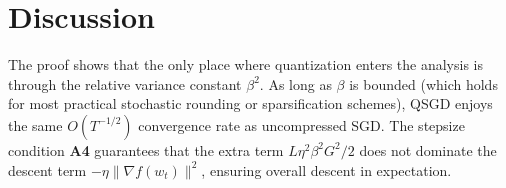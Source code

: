 \documentclass{article}
\begin{document}
\section*{Discussion}
The proof shows that the only place where quantization enters the analysis is through the relative variance constant $\beta^{2}$. As long as $\beta$ is bounded (which holds for most practical stochastic rounding or sparsification schemes), QSGD enjoys the same $O(T^{-1/2})$ convergence rate as uncompressed SGD. The stepsize condition \textbf{A4} guarantees that the extra term $L\eta^{2}\beta^{2}G^{2}/2$ does not dominate the descent term $-\eta\|\nabla f(w_{t})\|^{2}$, ensuring overall descent in expectation.
\end{document}
